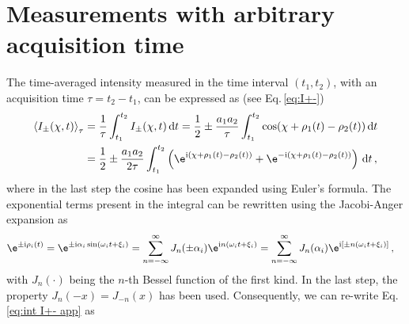 \documentclass[12pt]{iopart}
\newcommand{\eq}{Eq.}
\newcommand{\I}{\mathrm{i}}
\begin{document}
\section{Measurements with arbitrary acquisition time}\label{app:time-avg}
The time-averaged intensity measured in the time interval $(t_1,t_2)$, with an acquisition time $\tau=t_2-t_1$, can be expressed as (see \eq\,\eqref{eq:I+-})
\begin{align}
\begin{aligned}
    \braket{I_\pm(\chi, t)}_{\tau}&=\frac{1}{\tau} \int_{t_1}^{t_2} I_\pm(\chi,t) \, \mathrm{d}t = \frac{1}{2} \pm \frac{a_1 a_2}{\tau}\int_{t_1}^{t_2} \cos(\chi+\rho_1(t) - \rho_2(t)) \, \mathrm{d}t \\
    & = \frac{1}{2} \pm \frac{a_1 a_2}{2 \tau}\int_{t_1}^{t_2} \left(\e^{\I(\chi+\rho_1(t) - \rho_2(t))} + \e^{-\I(\chi+\rho_1(t) - \rho_2(t))}\right)\,\mathrm{d}t\, ,
\end{aligned} \label{eq:int I+- app}
\end{align}
where in the last step the cosine has been expanded using Euler's formula. The exponential terms present in the integral can be rewritten using the Jacobi-Anger expansion as
\begin{align}
\begin{aligned}
    \e^{\pm \I  \rho_i(t)}&=\e^{\pm \I  \alpha_i \sin(\omega_i t+\xi_i)} = \sum_{n=-\infty}^\infty J_n(\pm\alpha_i) \e^{\I  n(\omega_i t+\xi_i)}=\sum_{n=-\infty}^\infty J_n(\alpha_i) \e^{\I  \left[\pm n(\omega_i t+\xi_i)\right]} \, ,\label{eq:bessel1}
\end{aligned}
\end{align}
with $J_n(\cdot)$ being the $n$-th Bessel function of the first kind. In the last step, the property $J_n(-x)=J_{-n}(x)$
has been used. 
Consequently, we can re-write \eq\,\eqref{eq:int I+- app} as
\end{document}
